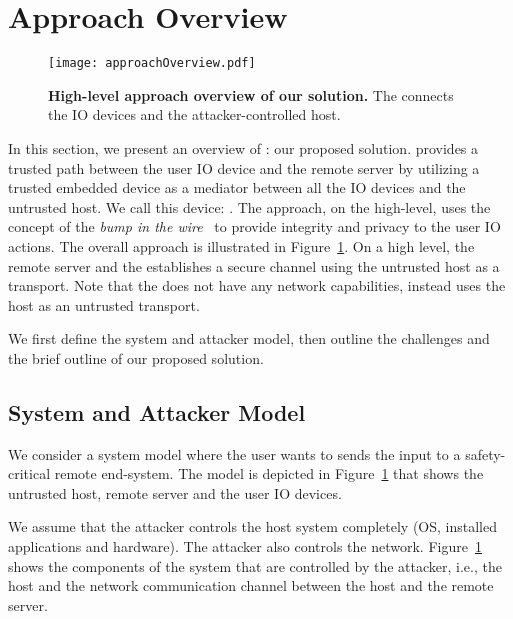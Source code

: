 \section{\name Approach Overview}
\label{sec:approach}


\begin{figure}[t]
\centering
\texttt{[image: approachOverview.pdf]}
\caption{\textbf{High-level approach overview of our solution.}  The \device connects the IO devices and the attacker-controlled host. }
\label{fig:approachOverview}
\centering
\end{figure}


In this section, we present an overview of \name: our proposed solution. \name provides a trusted path between the user IO device and the remote server by utilizing a trusted embedded device as a mediator between all the IO devices and the untrusted host. We call this device: \device. The approach, on the high-level, uses the concept of the \emph{bump in the wire}~\cite{McCPerRei2006} to provide integrity and privacy to the user IO actions. The overall approach is illustrated in Figure~\ref{fig:approachOverview}. On a high level, the remote server and the \device establishes a secure channel using the untrusted host as a transport. Note that the \device does not have any network capabilities, instead uses the host as an untrusted transport. %


We first define the system and attacker model, then outline the challenges and the brief outline of our proposed solution.



\subsection{System and Attacker Model}


We consider a system model where the user wants to sends the input to a safety-critical remote end-system. The model is depicted in Figure~\ref{fig:approachOverview} that shows the untrusted host, remote server and the user IO devices. 

We assume that the attacker controls the host system completely (OS, installed applications and hardware). The attacker also controls the network. %
Figure~\ref{fig:approachOverview} shows the components of the system that are controlled by the attacker, i.e., the host and the network communication channel between the host and the remote server.

